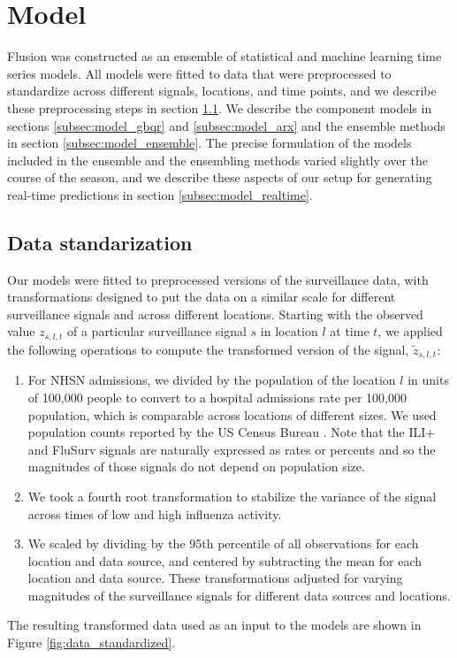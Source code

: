 \documentclass{article}\usepackage[]{graphicx}\usepackage[]{xcolor}
\begin{document}
\section{Model}
\label{sec:model}

Flusion was constructed as an ensemble of statistical and machine learning time series models.  All models were fitted to data that were preprocessed to standardize across different signals, locations, and time points, and we describe these preprocessing steps in section \ref{subsec:data_standardization}.  We describe the component models in sections \ref{subsec:model_gbqr} and \ref{subsec:model_arx} and the ensemble methods in section \ref{subsec:model_ensemble}.  The precise formulation of the models included in the ensemble and the ensembling methods varied slightly over the course of the season, and we describe these aspects of our setup for generating real-time predictions in section \ref{subsec:model_realtime}.

\subsection{Data standarization}
\label{subsec:data_standardization}

Our models were fitted to preprocessed versions of the surveillance data, with transformations designed to put the data on a similar scale for different surveillance signals and across different locations. Starting with the observed value $z_{s,l,t}$ of a particular surveillance signal $s$ in location $l$ at time $t$, we applied the following operations to compute the transformed version of the signal, $\tilde{z}_{s, l, t}$:
\begin{enumerate}
\item For NHSN admissions, we divided by the population of the location $l$ in units of 100,000 people to convert to a hospital admissions rate per 100,000 population, which is comparable across locations of different sizes. We used population counts reported by the US Census Bureau \cite{census_pop_older, census_pop_recent}. Note that the ILI+ and FluSurv signals are naturally expressed as rates or percents and so the magnitudes of those signals do not depend on population size.
\item We took a fourth root transformation to stabilize the variance of the signal across times of low and high influenza activity.
\item We scaled by dividing by the 95th percentile of all observations for each location and data source, and centered by subtracting the mean for each location and data source.  These transformations adjusted for varying magnitudes of the surveillance signals for different data sources and locations.
\end{enumerate}
The resulting transformed data used as an input to the models are shown in Figure \ref{fig:data_standardized}.
\end{document}
